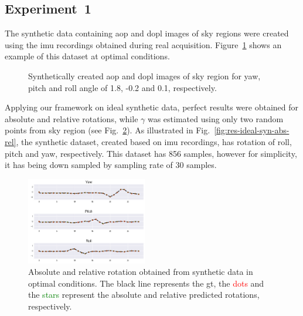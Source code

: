\subsection{Experiment~1}
\label{sec:exp1}
The synthetic data containing \gls{aop} and \gls{dopl} images of sky regions
were created using the \gls{imu} recordings obtained during real acquisition.
Figure~\ref{fig:aop-dop-syn} shows an example of this dataset at
optimal conditions.
\begin{figure}
    \centering
    \hfill
    \label{fig:aop-syn}
    \label{fig:dop-syn}
    \hspace*{\fill}
    \caption{Synthetically created \gls{aop} and \gls{dopl} images of sky
      region for yaw, pitch and roll angle of 1.8, -0.2 and 0.1, respectively.}
    \label{fig:aop-dop-syn}
\end{figure}

Applying our framework on ideal synthetic data, perfect results were obtained
for absolute and relative rotations, while $\gamma$ was estimated using only
two random points from sky region (see Fig.~\ref{fig:res-syn-ideal-abs-rel}).
As illustrated in Fig.~\ref{fig:res-ideal-syn-abs-rel}, the synthetic dataset,
created based on \gls{imu} recordings, has rotation of roll, pitch and yaw,
respectively. This dataset has 856 samples, however for simplicity, it has
being down sampled by sampling rate of 30 samples.

\begin{figure}
  \includegraphics[width=0.47\textwidth]{./content/experiments/figures/ideal-syn-abs-rel-2.jpg}
  \caption{Absolute and relative rotation obtained from synthetic data in
    optimal conditions. The black line represents the \gls{gt}, the
    \textcolor{red}{dots} and the \textcolor{green}{stars} represent the
    absolute and relative predicted rotations, respectively.}
  \label{fig:res-syn-ideal-abs-rel}
\end{figure}

